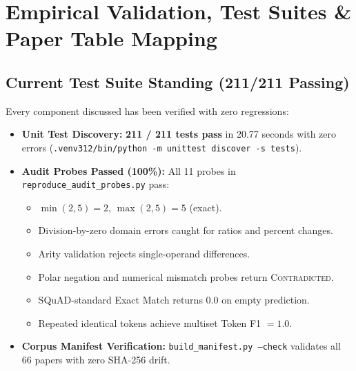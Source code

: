 \documentclass[11pt,a4paper]{article}
\begin{document}
\vspace{12pt}

\section{Empirical Validation, Test Suites \& Paper Table Mapping}

\subsection{Current Test Suite Standing (211/211 Passing)}
Every component discussed has been verified with zero regressions:
\begin{itemize}[leftmargin=*]
    \item \textbf{Unit Test Discovery:} \textbf{211 / 211 tests pass} in 20.77 seconds with zero errors (\texttt{.venv312/bin/python -m unittest discover -s tests}).
    \item \textbf{Audit Probes Passed (100\%):} All 11 probes in \texttt{reproduce\_audit\_probes.py} pass:
    \begin{itemize}
        \item $\min(2, 5) = 2$, $\max(2, 5) = 5$ (exact).
        \item Division-by-zero domain errors caught for ratios and percent changes.
        \item Arity validation rejects single-operand differences.
        \item Polar negation and numerical mismatch probes return \textsc{Contradicted}.
        \item SQuAD-standard Exact Match returns $0.0$ on empty prediction.
        \item Repeated identical tokens achieve multiset Token F1 $= 1.0$.
    \end{itemize}
    \item \textbf{Corpus Manifest Verification:} \texttt{build\_manifest.py --check} validates all 66 papers with zero SHA-256 drift.
\end{itemize}
\end{document}
